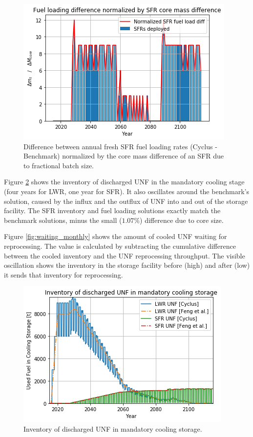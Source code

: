 \begin{figure}[htbp!]
    \begin{center}
        \includegraphics[scale=0.5]{./images/results_18/fuel_load_diff_norm.png}
    \end{center}
        \caption{Difference between annual fresh \gls{SFR} fuel loading rates (Cyclus - Benchmark) normalized by the core mass difference of an \gls{SFR} due to fractional batch size.}
    \label{fig:fuel_load_diff_norm}
\end{figure}


Figure \ref{fig:fuel_discharge_monthly} shows the inventory of discharged
\gls{UNF} in the mandatory cooling stage (four years for \gls{LWR}, one year for \gls{SFR}).
It also oscillates around the benchmark's solution, caused by the influx and the outflux of \gls{UNF} into and out of the storage facility.
The \gls{SFR} inventory and fuel loading
solutions exactly match the benchmark solutions, minus the small ($1.07\%$) difference due to core
size.

Figure \ref{fig:waiting_monthly} shows the amount of cooled \gls{UNF} waiting for
reprocessing. The value is calculated by subtracting the cumulative difference between
the cooled inventory and the \gls{UNF} reprocessing throughput.
The visible oscillation shows the inventory in the storage facility 
before (high) and after (low) it sends that inventory for reprocessing.

\begin{figure}[htbp!]
    \begin{center}
        \includegraphics[scale=0.5]{./images/results_18/fuel_discharge_monthly.png}
    \end{center}
        \caption{Inventory of discharged \gls{UNF} in mandatory cooling storage.}
    \label{fig:fuel_discharge_monthly}
\end{figure}



